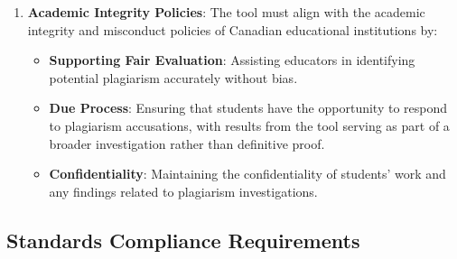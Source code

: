\documentclass[12pt]{article}
\begin{document}
\begin{enumerate}
    \item \textbf{Academic Integrity Policies}: The tool must align with the academic
    integrity and misconduct policies of Canadian educational institutions by:
    \begin{itemize}
        \item \textbf{Supporting Fair Evaluation}: Assisting educators in identifying
        potential plagiarism accurately without bias.
        \item \textbf{Due Process}: Ensuring that students have the opportunity to respond
        to plagiarism accusations, with results from the tool serving as part of a broader
        investigation rather than definitive proof.
        \item \textbf{Confidentiality}: Maintaining the confidentiality of students' work
        and any findings related to plagiarism investigations.
    \end{itemize}
\end{enumerate}

\subsection{Standards Compliance Requirements}
\end{document}
